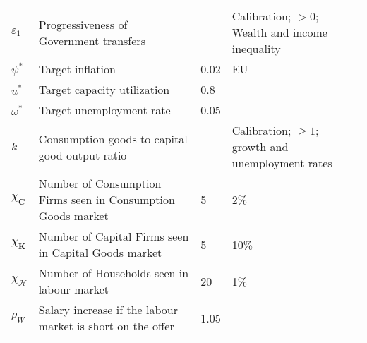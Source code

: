 \documentclass[a4paper, headings=standardclasses]{scrartcl}
\numberwithin{equation}{subsection}
\begin{document}
\begin{xltabular}{\linewidth}{lXlX}
    $\varepsilon_1$                   & Progressiveness of Government transfers                      &      & Calibration; $>0$; Wealth and income inequality                                                                                                                                                            \\
    $\psi^*$                     & Target inflation                                             & 0.02  & EU                                                                                                                                                            \\
    $u^*$                        & Target capacity utilization                                  & 0.8   &                                                                                                                                                             \\
    $\omega^*$                   & Target unemployment rate                                     & 0.05  &                                                                                                                                                             \\
    $k$                          & Consumption goods to capital good output ratio                    &      & Calibration; $\ge 1$; growth and unemployment rates                                                                                                                                                            \\
    $\chi_\mathbf{C}$            & Number of Consumption Firms seen in Consumption Goods market & 5      & 2\%                                                                                                                                                            \\
    $\chi_\mathbf{K}$            & Number of Capital Firms seen in Capital Goods market         & 5      & 10\%                                                                                                                                                            \\
    $\chi_\mathcal{H}$           & Number of Households seen in labour market                   & 20      & 1\%                                                                                                                                                            \\
    $\rho_W$                     & Salary increase if the labour market is short on the offer    & 1.05      &                                                                                                                                                             \\

\end{xltabular}
\end{document}
